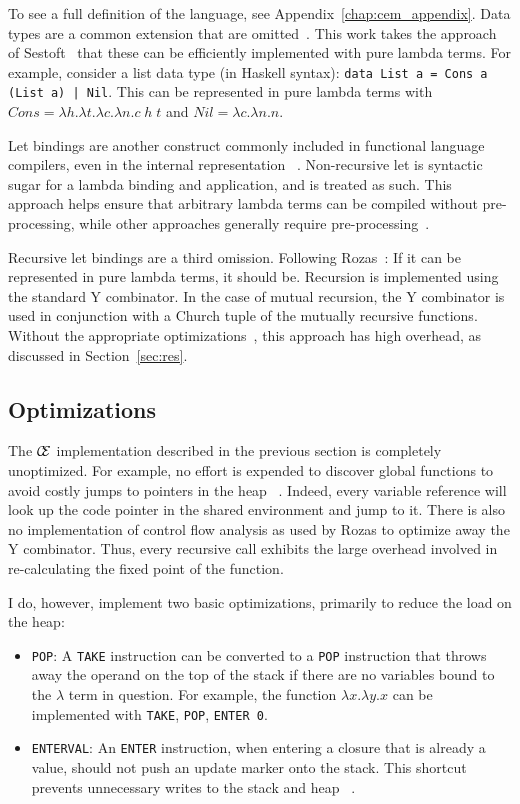 To see a full definition of the language, see Appendix~\ref{chap:cem_appendix}.
Data types are a common extension that are omitted~\cite{jonesstg,boquist1997grin}.
This work takes the approach of Sestoft~\cite{sestoft} that these can be
efficiently implemented with pure lambda terms. For example, consider a list
data type (in Haskell syntax): \texttt{data List a = Cons a (List a) | Nil}.
This can be represented in pure lambda terms with $\mathit{Cons} = \lambda
h.\lambda t.\lambda c.\lambda n.c \; h \; t$ and $\mathit{Nil} = \lambda
c.\lambda n.n$. 

Let bindings are another construct commonly included in functional
language compilers, even in the internal representation
~\cite{boquist1997grin,jonesstg}.  Non-recursive let is syntactic sugar for a
lambda binding and application, and is treated as such. This approach helps
ensure that arbitrary lambda terms can be compiled without pre-processing, while
other approaches generally require pre-processing~\cite{sestoft,TIM}.

Recursive let bindings are a third omission. Following
Rozas~\cite{rozas1992taming}: If it can be represented in pure lambda terms, it
should be. Recursion is implemented using the standard Y combinator. In the
case of mutual recursion, the Y combinator is used in conjunction with a Church
tuple of the mutually recursive functions. Without the appropriate
optimizations~\cite{rozas1992taming}, this approach has high overhead, as
discussed in Section~\ref{sec:res}.

\subsection{Optimizations}

The $\mathcal{C} \mskip -4mu \mathcal{E}$ implementation described in the previous section is 
completely unoptimized. For example, no effort is expended to
discover global functions to avoid costly jumps to pointers in the heap
~\cite{jonesstg}. Indeed, every variable reference will look up the code pointer
in the shared environment and jump to it. There is also no implementation of 
control flow analysis as used by Rozas to optimize away the Y combinator.  Thus,
every recursive call exhibits the large overhead involved in re-calculating the
fixed point of the function.  

I do, however, implement two basic optimizations, primarily to reduce the load
on the heap:

\begin{itemize}
\item \texttt{POP}: A \texttt{TAKE} instruction can be converted to a \texttt{POP}
instruction that throws away the operand on the top of the stack if there are no
variables bound to the $\lambda$ term in question. For example, the function
$\lambda x.\lambda y.x$ can be implemented with \texttt{TAKE}, \texttt{POP},
\texttt{ENTER 0}.  
\item \texttt{ENTERVAL}: An \texttt{ENTER} instruction, when entering a
closure that is already a value, should not push an update marker onto the
stack. This shortcut prevents unnecessary writes to the stack and heap
~\cite{jonesstg,lkm,sestoft}.  
\end{itemize}

